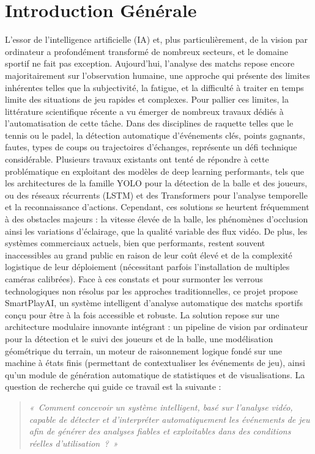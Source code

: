 \chapter*{Introduction Générale}
{}

L’essor de l’intelligence artificielle (IA) et, plus particulièrement, de la vision par
ordinateur a profondément transformé de nombreux secteurs, et le domaine sportif ne fait pas
exception. Aujourd’hui, l’analyse des matchs repose encore majoritairement sur l’observation
humaine, une approche qui présente des limites inhérentes telles que la subjectivité, la fatigue,
et la difficulté à traiter en temps limite des situations de jeu rapides et complexes.
Pour pallier ces limites, la littérature scientifique récente a vu émerger de nombreux
travaux dédiés à l'automatisation de cette tâche. Dans des disciplines de raquette telles que le
tennis ou le padel, la détection automatique d’événements clés, points gagnants, fautes, types
de coups ou trajectoires d'échanges, représente un défi technique considérable.
Plusieurs travaux existants ont tenté de répondre à cette problématique en exploitant des
modèles de deep learning performants, tels que les architectures de la famille YOLO pour la
détection de la balle et des joueurs, ou des réseaux récurrents (LSTM) et des Transformers
pour l'analyse temporelle et la reconnaissance d'actions. Cependant, ces solutions se heurtent
fréquemment à des obstacles majeurs : la vitesse élevée de la balle, les phénomènes
d’occlusion ainsi les variations d’éclairage, que la qualité variable des flux vidéo. De plus, les
systèmes commerciaux actuels, bien que performants, restent souvent inaccessibles au grand
public en raison de leur coût élevé et de la complexité logistique de leur déploiement
(nécessitant parfois l'installation de multiples caméras calibrées).
Face à ces constats et pour surmonter les verrous technologiques non résolus par les
approches traditionnelles, ce projet propose SmartPlayAI, un système intelligent d’analyse
automatique des matchs sportifs conçu pour être à la fois accessible et robuste. La solution
repose sur une architecture modulaire innovante intégrant : un pipeline de vision par
ordinateur pour la détection et le suivi des joueurs et de la balle, une modélisation
géométrique du terrain, un moteur de raisonnement logique fondé sur une machine à états
finis (permettant de contextualiser les événements de jeu), ainsi qu'un module de génération
automatique de statistiques et de visualisations.
La question de recherche qui guide ce travail est la suivante :
\begin{quote}
    \textit{«~Comment concevoir un système intelligent, basé sur l’analyse vidéo, capable de détecter et
d’interpréter automatiquement les événements de jeu afin de générer des analyses fiables et
exploitables dans des conditions réelles d’utilisation~?~»}
\end{quote}

